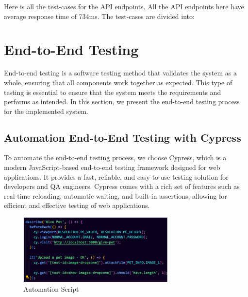 Here is all the test-cases for the API endpoints. All the API endpoints
here have average response time of 734ms. The test-cases are divided into:






















\section{End-to-End Testing}

End-to-end testing is a software testing method that validates the system as a whole, ensuring that all components work together as expected. This type of testing is essential to ensure that the system meets the requirements and performs as intended. In this section, we present the end-to-end testing process for the implemented system.

\subsection{Automation End-to-End Testing with Cypress}

To automate the end-to-end testing process, we choose Cypress, which is a modern JavaScript-based end-to-end testing framework designed for web applications. It provides a fast, reliable, and easy-to-use testing solution for developers and QA engineers. Cypress comes with a rich set of features such as real-time reloading, automatic waiting, and built-in assertions,  allowing for efficient and effective testing of web applications.

\begin{figure}[H]
    \centering
    \includegraphics[width=0.7\textwidth]{Figures/cypress_script.png}
    \caption{Automation Script}
    \label{fig:cypress-script}
\end{figure}


